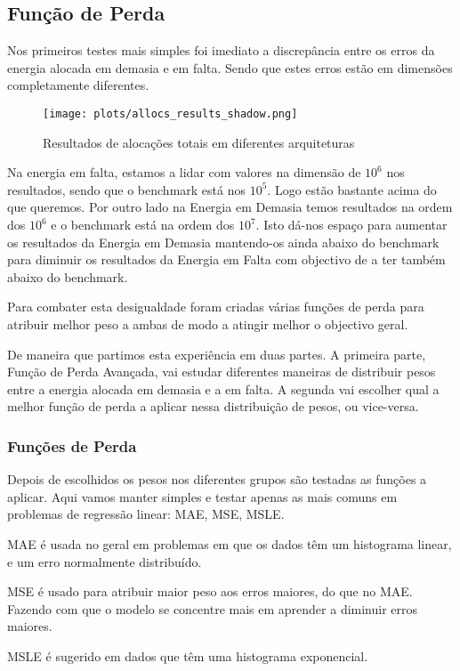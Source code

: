 \subsection{Função de Perda}

Nos primeiros testes mais simples foi imediato a discrepância entre os erros da energia alocada em demasia e em falta. Sendo que estes erros estão em dimensões completamente diferentes.
\begin{figure}[H]
    \centering
    \texttt{[image: plots/allocs\_results\_shadow.png]}
    \caption{Resultados de alocações totais em diferentes arquiteturas}
    \label{fig:resexparchs}
  \end{figure}

Na energia em falta, estamos a lidar com valores na dimensão de $10^{6}$ nos resultados, sendo que o benchmark está nos $10^{5}$. Logo estão bastante acima do que queremos. Por outro lado na Energia em Demasia temos resultados na ordem dos $10^{6}$ e o benchmark está na ordem dos $10^{7}$. Isto dá-nos espaço para aumentar os resultados da Energia em Demasia mantendo-os ainda abaixo do benchmark para diminuir os resultados da Energia em Falta com objectivo de a ter também abaixo do benchmark.\par
Para combater esta desigualdade foram criadas várias funções de perda para atribuir melhor peso a ambas de modo a atingir melhor o objectivo geral.\par
De maneira que partimos esta experiência em duas partes. A primeira parte, Função de Perda Avançada, vai estudar diferentes maneiras de distribuir pesos entre a energia alocada em demasia e a em falta. A segunda vai escolher qual a melhor função de perda a aplicar nessa distribuição de pesos, ou vice-versa.\par


\subsubsection{Funções de Perda}
Depois de escolhidos os pesos nos diferentes grupos são testadas as funções a aplicar. Aqui vamos manter simples e testar apenas as mais comuns em problemas de regressão linear: \gls{MAE}, \gls{MSE}, \gls{MSLE}.\par
\gls{MAE} é usada no geral em problemas em que os dados têm um histograma linear, e um erro normalmente distribuído.\par
\gls{MSE} é usado para atribuir maior peso aos erros maiores, do que no \gls{MAE}. Fazendo com que o modelo se concentre mais em aprender a diminuir erros maiores.\par
\gls{MSLE} é sugerido em dados que têm uma histograma exponencial.\par

